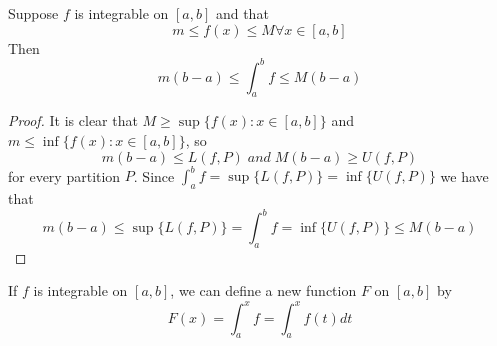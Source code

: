 \documentclass[12pt, a4paper, oneside, openright, titlepage]{book}
\begin{document}
\begin{thm}\label{thm:boundint}
    Suppose $f$ is integrable on $[a,b]$ and that \begin{equation}
        m \leq f(x) \leq M \forall x \in [a,b]
    \end{equation}
    Then \begin{equation}
        m(b-a) \leq \int_a^bf \leq M(b-a)
    \end{equation}
\end{thm}
\begin{proof}
    It is clear that $M \geq \sup\{f(x):x \in [a,b]\}$ and $m \leq \inf\{f(x):x\in [a,b]\}$, so \begin{equation*}
        m(b-a) \leq L(f,P)\;and\;M(b-a) \geq U(f,P)
    \end{equation*}
    for every partition $P$. Since $\int_a^bf = \sup\{L(f,P)\} = \inf\{U(f,P)\}$ we have that \begin{equation*}
        m(b-a) \leq \sup\{L(f,P)\} = \int_a^bf = \inf\{U(f,P)\} \leq M(b-a)
    \end{equation*}
\end{proof}

\begin{rmk}
    If $f$ is integrable on $[a,b]$, we can define a new function $F$ on $[a,b]$ by \begin{equation}
        F(x) = \int_a^xf = \int_a^xf(t)dt
    \end{equation}
\end{rmk}
\end{document}
